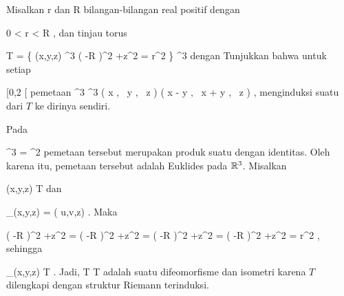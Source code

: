 {

Misalkan
\mathkor {} {r} {dan} {R} {}
bilangan-bilangan real positif dengan

\mavergleichskette
{\vergleichskette
{ 0
}
{ < }{ r
}
{ < }{ R
}
{    }{
}
{   }{
}
}
{}{}{,}
dan tinjau torus
 {} {}

\mavergleichskettedisp
{\vergleichskette
{ T
}
{ =} { \left\{ (x,y,z) \in \R^3  \mid   \left(   -R  \right)^2 +z^2  = r^2         \right\}
}
{ \subseteq} { \R^3
}
{ } {
}
{ } {
}
}
{}{}{}
dengan
Tunjukkan bahwa untuk setiap

\mavergleichskette
{\vergleichskette
{ \alpha
}
{ \in }{ [0,2 \pi [
}
{  }{
}
{    }{
}
{   }{
}
}
{}{}{}
pemetaan
\maabbeledisp {\Psi_\alpha} {\R^3} {\R^3
} { \left(  x   , \,   y  , \,  z                 \right) } { \left(  x \cos \alpha - y \sin  \alpha   , \,   x \sin \alpha + y \cos  \alpha  , \,  z                 \right)
} {,}
menginduksi suatu
dari $T$ ke dirinya sendiri.

}
{

Pada

\mavergleichskettedisp
{\vergleichskette
{ \R^3
}
{ =} { \R^2 \times \R
}
{ } {
}
{ } {
}
{ } {
}
}
{}{}{}
pemetaan tersebut merupakan produk suatu
dengan identitas. Oleh karena itu, pemetaan tersebut adalah
Euklides pada ${\mathbb R}^3$. Misalkan

\mavergleichskette
{\vergleichskette
{ (x,y,z)
}
{ \in }{  T
}
{  }{
}
{    }{
}
{   }{
}
}
{}{}{}
dan

\mavergleichskettedisp
{\vergleichskette
{ \Psi_\alpha(x,y,z)
}
{ =} { ( u,v,z)
}
{ } {
}
{ } {
}
{ } {
}
}
{}{}{.}
Maka

\mavergleichskettealigndrucklinks
{\vergleichskettealigndrucklinks
{ \left(   -R  \right)^2 +z^2
}
{ =} { \left(   -R  \right)^2 +z^2
}
{ =} { \left(   -R  \right)^2 +z^2
}
{ =} { \left(   -R  \right)^2 +z^2
}
{ =} { r^2
}
}
{}{}{,}
sehingga

\mavergleichskette
{\vergleichskette
{ \Psi_\alpha(x,y,z)
}
{ \in }{  T
}
{  }{
}
{    }{
}
{   }{
}
}
{}{}{.}
Jadi,
\maabbdisp {\Psi_\alpha} { T} {T
} {}
adalah suatu difeomorfisme dan isometri karena $T$ dilengkapi dengan struktur Riemann terinduksi.

 }



